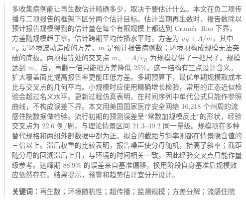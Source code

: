 \begin{abstract}
\noindent 多收集病例能让再生数估计精确多少，取决于要估计什么。本文在负二项传播与二项报告的框架下区分两个估计目标。估计当期再生数时，报告数除以预计报告规模得到的估计量在每个有限规模上都达到 Cramér--Rao 下界，方差随规模趋于零。估计跨期平均传播水平时，方差为 $v_R+A/m$，其中 $v_R$ 是环境波动造成的方差，$m$ 是预计报告病例数；环境项构成规模无法突破的底板。两项相等处的交叉点 $m_\times=A/v_R$ 为规模提供了一把尺子。规模达到 $m_\times$ 后，再翻一倍只能把方差降低 25\%。这一结构有三点设计含义。扩大覆盖面比提高报告率更能压低方差。多期预算下，最优单期规模取成本比与交叉点的几何平均。小规模时应使用精确增长检验，常用的正态近似检验会超过名义水平。更新过程仿真表明，在时间序列中单代公式只能作参照曲线，不构成误差下界。本文用美国国家医疗安全网络 16,218 个州周的流感住院数据做检验。流行初期的预测误差呈“常数加规模反比”的形状，经验交叉点为 22.6 例/周，与理论情景区间 21.3--49.2 同一量级。规模项在多种替代规格和两组外部数据中都为正。拟合的截距与斜率则都在情景隐含值的三倍以上。滞后权重的比较表明，报告噪声使分母随机，抬高了斜率；截距随分母的回溯滞后上升，与环境的时间相关一致。因此经验交叉点只能作量级参考。达峰期 88.9\% 的误差来自基准偏移，换用阶段自身基准后规模效应依然存在。结果提示，预警和趋势估计宜分开设计。

\vspace{0.6em}
\noindent\textbf{关键词：}再生数；环境随机性；超传播；监测规模；方差分解；流感住院
\end{abstract}
